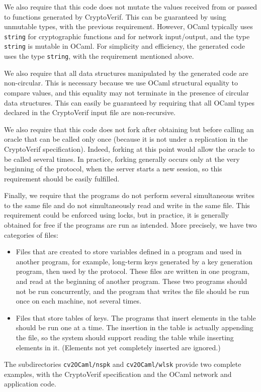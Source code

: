 \begin{itemize}
We also require that this code does not mutate the values received
from or passed to functions generated by CryptoVerif. This can be
guaranteed by using unmutable types, with the previous requirement.
However, OCaml typically uses \texttt{string} for cryptographic
functions and for network input/output, and the type \texttt{string}
is mutable in OCaml. For simplicity and efficiency, the generated 
code uses the type \texttt{string}, with the requirement mentioned above.

We also require that all data structures manipulated by the generated
code are non-circular. This is necessary because we use OCaml
structural equality to compare values, and this equality may not
terminate in the presence of circular data structures. This can easily
be guaranteed by requiring that all OCaml types declared in the
CryptoVerif input file are non-recursive.

We also require that this code does not fork after obtaining but
before calling an oracle that can be called only once (because it is
not under a replication in the CryptoVerif specification). Indeed,
forking at this point would allow the oracle to be called several times.
In practice, forking generally occurs only at the very beginning of the
protocol, when the server starts a new session, so this requirement
should be easily fulfilled.

Finally, we require that the programs do not perform several
simultaneous writes to the same file and do not simultaneously read
and write in the same file. This requirement could be enforced using
locks, but in practice, it is generally obtained for free if the
programs are run as intended. More precisely, we have two categories
of files:
\begin{itemize}

\item Files that are created to store variables defined in a program
and used in another program, for example, long-term keys generated by
a key generation program, then used by the protocol. These files are
written in one program, and read at the beginning of another
program. These two programs should not be run concurrently, and the
program that writes the file should be run once on each machine,
not several times.

\item Files that store tables of keys. The programs that insert elements 
in the table should be run one at a time. The insertion in the table
is actually appending the file, so the system should support reading the
table while inserting elements in it.  (Elements not yet completely
inserted are ignored.)

\end{itemize}

\end{itemize} 
The subdirectories \texttt{cv2OCaml/nspk} and
\texttt{cv2OCaml/wlsk} provide two complete examples,
with the CryptoVerif specification and the OCaml network and application
code.


